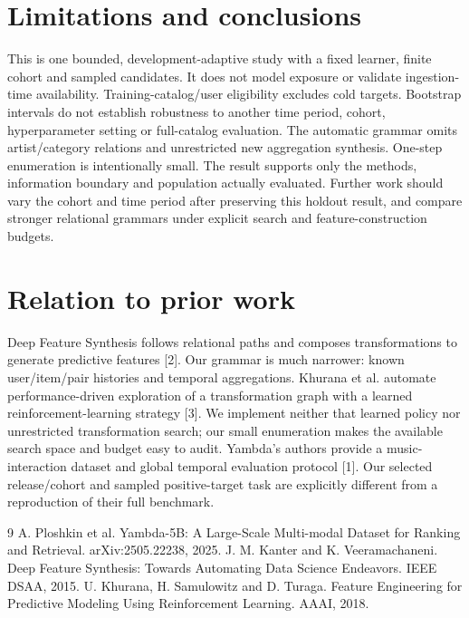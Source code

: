 \documentclass[10pt,a4paper]{article}
\begin{document}
\section{Limitations and conclusions}
This is one bounded, development-adaptive study with a fixed learner, finite
cohort and sampled candidates. It does not model exposure or validate
ingestion-time availability. Training-catalog/user eligibility excludes cold
targets. Bootstrap intervals do not establish robustness to another time
period, cohort, hyperparameter setting or full-catalog evaluation.
The automatic grammar omits artist/category relations and unrestricted
new aggregation synthesis. One-step enumeration is intentionally small.
The result supports only the methods, information boundary and population
actually evaluated. Further work should vary the cohort and time period
after preserving this holdout result, and compare stronger relational
grammars under explicit search and feature-construction budgets.
\clearpage
\section{Relation to prior work}
Deep Feature Synthesis follows relational paths and composes transformations
to generate predictive features [2]. Our grammar is much narrower: known
user/item/pair histories and temporal aggregations. Khurana et al. automate
performance-driven exploration of a transformation graph with a learned
reinforcement-learning strategy [3]. We implement neither that learned
policy nor unrestricted transformation search; our small enumeration makes
the available search space and budget easy to audit. Yambda's authors provide
a music-interaction dataset and global temporal evaluation protocol [1].
Our selected release/cohort and sampled positive-target task are explicitly
different from a reproduction of their full benchmark.

\begin{thebibliography}{9}
 A. Ploshkin et al. Yambda-5B: A Large-Scale Multi-modal
Dataset for Ranking and Retrieval. arXiv:2505.22238, 2025.
 J. M. Kanter and K. Veeramachaneni. Deep Feature Synthesis:
Towards Automating Data Science Endeavors. IEEE DSAA, 2015.
 U. Khurana, H. Samulowitz and D. Turaga. Feature Engineering
for Predictive Modeling Using Reinforcement Learning. AAAI, 2018.
\end{thebibliography}
\end{document}
